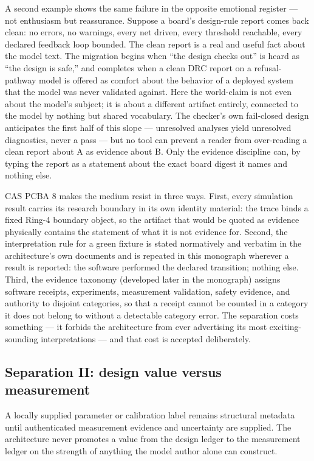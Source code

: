 A second example shows the same failure in the opposite emotional
register --- not enthusiasm but reassurance. Suppose a board's design-rule
report comes back clean: no errors, no warnings, every net driven, every
threshold reachable, every declared feedback loop bounded. The clean report
is a real and useful fact about the model text. The migration begins when
``the design checks out'' is heard as ``the design is safe,'' and completes
when a clean DRC report on a refusal-pathway model is offered as comfort
about the behavior of a deployed system that the model was never validated
against. Here the world-claim is not even about the model's subject; it is
about a different artifact entirely, connected to the model by nothing but
shared vocabulary. The checker's own fail-closed design anticipates the
first half of this slope --- unresolved analyses yield unresolved
diagnostics, never a pass --- but no tool can prevent a reader from
over-reading a clean report about A as evidence about B. Only the evidence
discipline can, by typing the report as a statement about the exact board
digest it names and nothing else.

CAS PCBA 8 makes the medium resist in three ways. First, every simulation
result carries its research boundary in its own identity material: the trace
binds a fixed Ring-4 boundary object, so the artifact that would be quoted as
evidence physically contains the statement of what it is not evidence for.
Second, the interpretation rule for a green fixture is stated normatively and
verbatim in the architecture's own documents and is repeated in this
monograph wherever a result is reported: the software performed the declared
transition; nothing else. Third, the evidence taxonomy (developed later in
the monograph) assigns software receipts, experiments, measurement
validation, safety evidence, and authority to disjoint categories, so that a
receipt cannot be counted in a category it does not belong to without a
detectable category error. The separation costs something --- it forbids the
architecture from ever advertising its most exciting-sounding
interpretations --- and that cost is accepted deliberately.

\subsection{Separation II: design value versus measurement}\label{ch01:sep:designmeasure}

\begin{ruleenv}\label{ch01:rule:designmeasure}
A locally supplied parameter or calibration label remains structural metadata
until authenticated measurement evidence and uncertainty are supplied. The
architecture never promotes a value from the design ledger to the measurement
ledger on the strength of anything the model author alone can construct.
\end{ruleenv}


